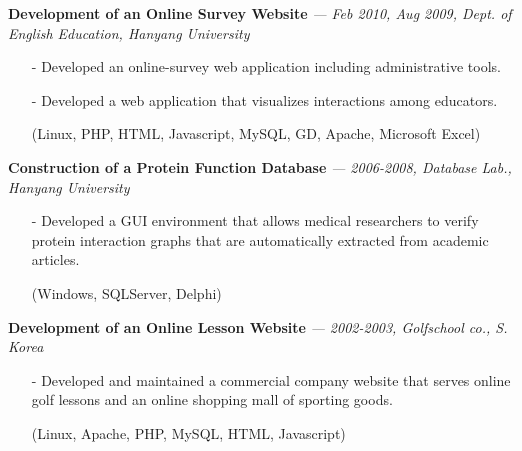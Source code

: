   \vspace{-0.15in}
{\bf Development of an Online Survey Website}
  {\it \footnotesize --- Feb 2010, Aug 2009, Dept. of English Education, Hanyang University}
  \begin{itemize}[leftmargin=*]
    \setlength\itemsep{-0.02in}
     \item[-] Developed an online-survey web application including administrative tools.
     \item[-] Developed a web application that visualizes interactions among educators.
     \item[] {\small(Linux, PHP, HTML, Javascript, MySQL, GD, Apache, Microsoft Excel)}
  \end{itemize}

  \vspace{-0.15in}
  {\bf Construction of a Protein Function Database} 
    {\it \footnotesize --- 2006-2008, Database Lab., Hanyang University}
    \begin{itemize}[leftmargin=*]
    \setlength\itemsep{-0.02in}
    \item[-] Developed a GUI environment that allows medical researchers to verify protein interaction graphs
             that are automatically extracted from academic articles.
    \item[] {\small(Windows, SQLServer, Delphi)}
    \end{itemize}

    
  \vspace{-0.15in}
  {\bf Development of an Online Lesson Website}
    {\it \footnotesize --- 2002-2003, Golfschool co., S. Korea}
    \begin{itemize}[leftmargin=*]
    \setlength\itemsep{-0.02in}
     \item[-] Developed and maintained a commercial company website that 
              serves online golf lessons and an online shopping mall of sporting goods.
     \item[]  {\small(Linux, Apache, PHP, MySQL, HTML, Javascript)}
    \end{itemize}
